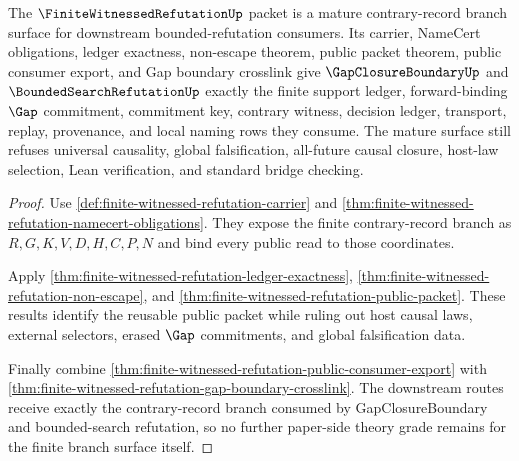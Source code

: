 \begin{theorem}
\label{thm:finite-witnessed-refutation-mature-budget}
The $\FiniteWitnessedRefutationUp$ packet is a mature contrary-record branch surface for downstream bounded-refutation consumers. Its carrier, NameCert obligations, ledger exactness, non-escape theorem, public packet theorem, public consumer export, and Gap boundary crosslink give $\GapClosureBoundaryUp$ and $\BoundedSearchRefutationUp$ exactly the finite support ledger, forward-binding $\Gap$ commitment, commitment key, contrary witness, decision ledger, transport, replay, provenance, and local naming rows they consume. The mature surface still refuses universal causality, global falsification, all-future causal closure, host-law selection, Lean verification, and standard bridge checking.
\end{theorem}
\begin{proof}
Use \autoref{def:finite-witnessed-refutation-carrier} and \autoref{thm:finite-witnessed-refutation-namecert-obligations}. They expose the finite contrary-record branch as $R,G,K,V,D,H,C,P,N$ and bind every public read to those coordinates.

Apply \autoref{thm:finite-witnessed-refutation-ledger-exactness}, \autoref{thm:finite-witnessed-refutation-non-escape}, and \autoref{thm:finite-witnessed-refutation-public-packet}. These results identify the reusable public packet while ruling out host causal laws, external selectors, erased $\Gap$ commitments, and global falsification data.

Finally combine \autoref{thm:finite-witnessed-refutation-public-consumer-export} with \autoref{thm:finite-witnessed-refutation-gap-boundary-crosslink}. The downstream routes receive exactly the contrary-record branch consumed by GapClosureBoundary and bounded-search refutation, so no further paper-side theory grade remains for the finite branch surface itself.
\end{proof}


